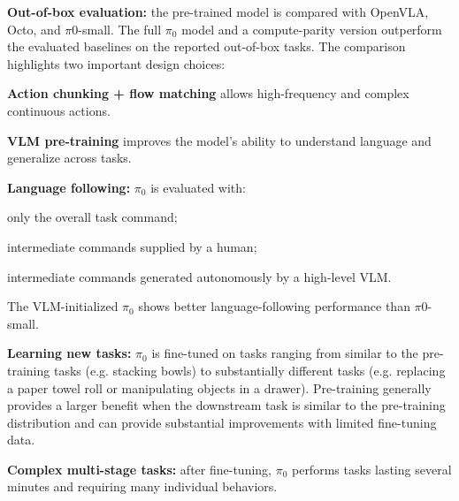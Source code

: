 \begin{dashlist}
\item \textbf{Out-of-box evaluation:} the pre-trained model is compared with OpenVLA, Octo, and $\pi0$-small. The full $\pi_0$ model and a compute-parity version outperform the evaluated baselines on the reported out-of-box tasks. The comparison highlights two important design choices:
\begin{dashlist}
    \item \textbf{Action chunking + flow matching} allows high-frequency and complex continuous actions.
    \item \textbf{VLM pre-training} improves the model's ability to understand language and generalize across tasks.
\end{dashlist}
\item \textbf{Language following:} $\pi_0$ is evaluated with:
\begin{dashlist}
    \item only the overall task command;
    \item intermediate commands supplied by a human;
    \item intermediate commands generated autonomously by a high-level VLM.
\end{dashlist}
The VLM-initialized $\pi_0$ shows better language-following performance than $\pi0$-small.
\item \textbf{Learning new tasks:} $\pi_0$ is fine-tuned on tasks ranging from similar to the pre-training tasks (e.g. stacking bowls) to substantially different tasks (e.g. replacing a paper towel roll or manipulating objects in a drawer). Pre-training generally provides a larger benefit when the downstream task is similar to the pre-training distribution and can provide substantial improvements with limited fine-tuning data.
\item \textbf{Complex multi-stage tasks:} after fine-tuning, $\pi_0$ performs tasks lasting several minutes and requiring many individual behaviors.

\end{dashlist}
